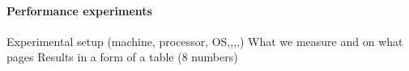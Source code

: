 \documentclass{llncs}
\begin{document}






\paragraph{Performance experiments}
Experimental setup (machine, processor, OS,,,,)
What we measure and on what pages
Results in a form of a table (8 numbers)
\end{document}
